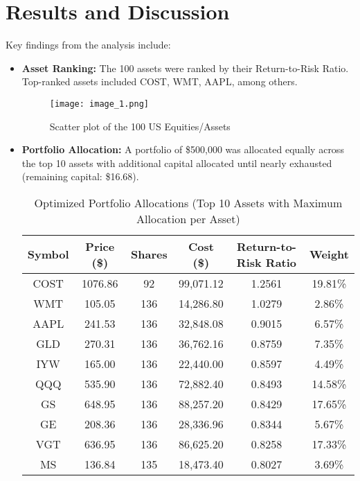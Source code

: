 \documentclass[11pt]{article}
\begin{document}
\section{Results and Discussion}
Key findings from the analysis include:
\begin{itemize}
    \item \textbf{Asset Ranking:} The 100 assets were ranked by their Return-to-Risk Ratio. Top-ranked assets included COST, WMT, AAPL, among others.
    \begin{figure}[H]
    \centering
    \texttt{[image: image\_1.png]}
    \caption{Scatter plot of the 100 US Equities/Assets }
    \label{fig:scatter plot}
\end{figure}

    \item \textbf{Portfolio Allocation:} A portfolio of \$500,000 was allocated equally across the top 10 assets with additional capital allocated until nearly exhausted (remaining capital: \$16.68).
    \begin{table}[H]
    \centering
    \caption{Optimized Portfolio Allocations (Top 10 Assets with Maximum Allocation per Asset)}
    \begin{tabular}{|c|c|c|c|c|c|}
        \hline
        \textbf{Symbol} & \textbf{Price (\$)} & \textbf{Shares} & \textbf{Cost (\$)} & \textbf{Return-to-Risk Ratio} & \textbf{Weight} \\ 
        \hline
        COST  & 1076.86  & 92  & 99,071.12  & 1.2561  & 19.81\%  \\
        WMT   & 105.05   & 136 & 14,286.80  & 1.0279  & 2.86\%   \\
        AAPL  & 241.53   & 136 & 32,848.08  & 0.9015  & 6.57\%   \\
        GLD   & 270.31   & 136 & 36,762.16  & 0.8759  & 7.35\%   \\
        IYW   & 165.00   & 136 & 22,440.00  & 0.8597  & 4.49\%   \\
        QQQ   & 535.90   & 136 & 72,882.40  & 0.8493  & 14.58\%  \\
        GS    & 648.95   & 136 & 88,257.20  & 0.8429  & 17.65\%  \\
        GE    & 208.36   & 136 & 28,336.96  & 0.8344  & 5.67\%   \\
        VGT   & 636.95   & 136 & 86,625.20  & 0.8258  & 17.33\%  \\
        MS    & 136.84   & 135 & 18,473.40  & 0.8027  & 3.69\%   \\
        \hline
    \end{tabular}
    \label{tab:optimized_portfolio}
\end{table}


\end{itemize}
\end{document}
